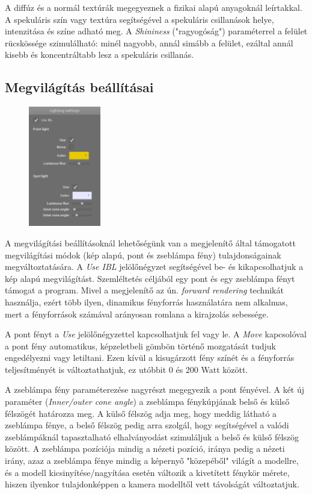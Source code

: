A diffúz és a normál textúrák megegyeznek a fizikai alapú anyagoknál leírtakkal. A spekuláris szín vagy textúra segítségével a spekuláris csillanások helye, intenzitása és színe adható meg. A \textit{Shininess} ("ragyogóság") paraméterrel a felület rücskössége szimulálható: minél nagyobb, annál simább a felület, ezáltal annál kisebb és koncentráltabb lesz a spekuláris csillanás.

\clearpage

\subsection{Megvilágítás beállításai}

\begin{figure}
    \vspace{-23pt}
    \includegraphics[width=0.28\textwidth]{images/lighting_settings.png}
    \vspace{-20pt}
\end{figure}

A megvilágítási beállításoknál lehetőségünk van a megjelenítő által támogatott megvilágítási módok (kép alapú, pont és zseblámpa fény) tulajdonságainak megváltoztatására. A \textit{Use IBL} jelölőnégyzet segítségével be- és kikapcsolhatjuk a kép alapú megvilágítást. Szemléltetés céljából egy pont és egy zseblámpa fényt támogat a program. Mivel a megjelenítő az ún. \textit{forward rendering} technikát használja, ezért több ilyen, dinamikus fényforrás használatára nem alkalmas, mert a fényforrások számával arányosan romlana a kirajzolás sebessége.

A pont fényt a \textit{Use} jelölőnégyzettel kapcsolhatjuk fel vagy le. A \textit{Move} kapcsolóval a pont fény automatikus, képzeletbeli gömbön történő mozgatását tudjuk engedélyezni vagy letiltani. Ezen kívül a kisugárzott fény színét és a fényforrás teljesítményét is változtathatjuk, ez utóbbit 0 és 200 Watt között.

A zseblámpa fény paraméterezése nagyrészt megegyezik a pont fényével. A két új paraméter (\textit{Inner/outer cone angle}) a zseblámpa fénykúpjának belső és külső félszögét határozza meg. A külső félszög adja meg, hogy meddig látható a zseblámpa fénye, a belső félszög pedig arra szolgál, hogy segítségével a valódi zseblámpáknál tapasztalható elhalványodást szimuláljuk a belső és külső félszög között. A zseblámpa pozíciója mindig a nézeti pozíció, iránya pedig a nézeti irány, azaz a zseblámpa fénye mindig a képernyő "közepéből" világít a modellre, és a modell kicsinyítése/nagyítása esetén változik a kivetített fénykör mérete, hiszen ilyenkor tulajdonképpen a kamera modelltől vett távolságát változtatjuk.
